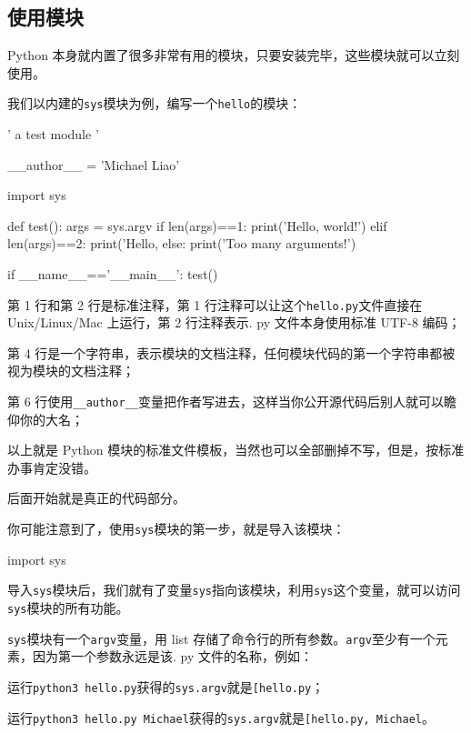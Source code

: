 \hypertarget{ux4f7fux7528ux6a21ux5757}{%
\subsection{使用模块}\label{ux4f7fux7528ux6a21ux5757}}

Python
本身就内置了很多非常有用的模块，只要安装完毕，这些模块就可以立刻使用。

我们以内建的\texttt{sys}模块为例，编写一个\texttt{hello}的模块：

\begin{pythoncode}
' a test module '

__author__ = 'Michael Liao'

import sys

def test():
    args = sys.argv
    if len(args)==1:
        print('Hello, world!')
    elif len(args)==2:
        print('Hello, %
    else:
        print('Too many arguments!')

if __name__=='__main__':
    test()
\end{pythoncode}

第 1 行和第 2 行是标准注释，第 1
行注释可以让这个\texttt{hello.py}文件直接在 Unix/Linux/Mac 上运行，第 2
行注释表示. py 文件本身使用标准 UTF-8 编码；

第 4
行是一个字符串，表示模块的文档注释，任何模块代码的第一个字符串都被视为模块的文档注释；

第 6
行使用\texttt{\_\_author\_\_}变量把作者写进去，这样当你公开源代码后别人就可以瞻仰你的大名；

以上就是 Python
模块的标准文件模板，当然也可以全部删掉不写，但是，按标准办事肯定没错。

后面开始就是真正的代码部分。

你可能注意到了，使用\texttt{sys}模块的第一步，就是导入该模块：

\begin{pythoncode}
import sys
\end{pythoncode}

导入\texttt{sys}模块后，我们就有了变量\texttt{sys}指向该模块，利用\texttt{sys}这个变量，就可以访问\texttt{sys}模块的所有功能。

\texttt{sys}模块有一个\texttt{argv}变量，用 list
存储了命令行的所有参数。\texttt{argv}至少有一个元素，因为第一个参数永远是该.
py 文件的名称，例如：

运行\texttt{python3\ hello.py}获得的\texttt{sys.argv}就是\texttt{{[}\textquotesingle{}hello.py\textquotesingle{}{]}}；

运行\texttt{python3\ hello.py\ Michael}获得的\texttt{sys.argv}就是\texttt{{[}\textquotesingle{}hello.py\textquotesingle{},\ \textquotesingle{}Michael\textquotesingle{}{]}}。

